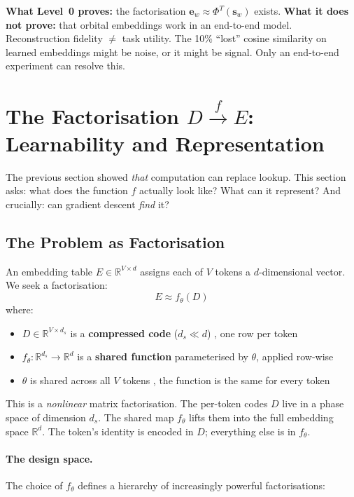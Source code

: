 \documentclass[11pt, a4paper]{article}
\newcommand{\s}{\mathbf{s}}
\newcommand{\R}{\mathbb{R}}
\theoremstyle{remark}
\begin{document}
\textbf{What Level~0 proves:} the factorisation $\mathbf{e}_w \approx \Phi^T(\s_w)$ exists.
\textbf{What it does not prove:} that orbital embeddings work in an end-to-end model.
Reconstruction fidelity $\neq$ task utility.
The 10\% ``lost'' cosine similarity on learned embeddings might be noise, or it might be signal.
Only an end-to-end experiment can resolve this.


\section{The Factorisation $D \xrightarrow{f} E$: Learnability and Representation}

The previous section showed \emph{that} computation can replace lookup.
This section asks: what does the function $f$ actually look like?
What can it represent?
And crucially: can gradient descent \emph{find} it?

\subsection{The Problem as Factorisation}

An embedding table $E \in \R^{V \times d}$ assigns each of $V$ tokens a $d$-dimensional vector.
We seek a factorisation:
\[
    E \approx f_\theta(D)
\]
where:
\begin{itemize}[nosep]
    \item $D \in \R^{V \times d_s}$ is a \textbf{compressed code} ($d_s \ll d$) ,  one row per token
    \item $f_\theta: \R^{d_s} \to \R^d$ is a \textbf{shared function} parameterised by $\theta$, applied row-wise
    \item $\theta$ is shared across all $V$ tokens ,  the function is the same for every token
\end{itemize}

\noindent
This is a \emph{nonlinear} matrix factorisation.
The per-token codes $D$ live in a phase space of dimension $d_s$.
The shared map $f_\theta$ lifts them into the full embedding space $\R^d$.
The token's identity is encoded in $D$; everything else is in $f_\theta$.

\paragraph{The design space.}
The choice of $f_\theta$ defines a hierarchy of increasingly powerful factorisations:
\end{document}
